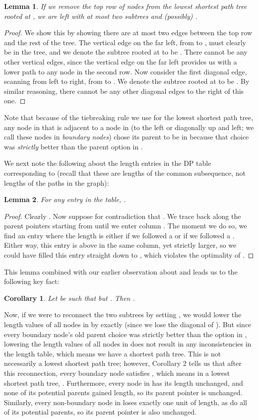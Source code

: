 \documentclass{article}
\newtheorem{lemma}{Lemma}
\newtheorem{corollary}{Corollary}
\begin{document}
\begin{lemma}
If we remove the top row of nodes from the lowest shortest path tree rooted at , we are left with at most two subtrees  and (possibly) .
\end{lemma}
\begin{proof}
We show this by showing there are at most two edges between the top row and the rest of the tree.  The vertical edge on the far left, from  to , must clearly be in the tree, and we denote the subtree rooted at  to be .  There cannot be any other vertical edges, since the vertical edge on the far left provides us with a lower path to any node in the second row.  Now consider the first diagonal edge, scanning from left to right, from  to .  We denote the subtree rooted at  to be .  By similar reasoning, there cannot be any other diagonal edges to the right of this one.
\end{proof}

Note that because of the tiebreaking rule we use for the lowest shortest path tree, any node in  that is adjacent to a node in  (to the left or diagonally up and left; we call these nodes in  \emph{boundary nodes}) chose its parent to be in  because that choice was \emph{strictly} better than the parent option in .

We next note the following about the length entries in the DP table corresponding to  (recall that these are lengths of the common subsequence, not lengths of the paths in the graph):
\begin{lemma}
For any entry  in the table, .
\end{lemma}
\begin{proof}
Clearly .  Now suppose for contradiction that .  We trace back along the parent pointers starting from  until we enter column .  The moment we do so, we find an entry where the length is either  if we followed a  or  if we followed a .  Either way, this entry is above  in the same column, yet strictly larger, so we could have filled this entry straight down to , which violates the optimality of .
\end{proof}

This lemma combined with our earlier observation about  and  leads us to the following key fact:
\begin{corollary}
Let  be such that  but .  Then .
\end{corollary}

Now, if we were to reconnect the two subtrees by setting , we would lower the length values of all nodes in  by exactly  (since we lose the diagonal of ).  But since every boundary node's old parent choice was strictly better than the option in , lowering the length values of all nodes in  does not result in any inconsistencies in the length table, which means we have a shortest path tree.  This is not necessarily a lowest shortest path tree; however, Corollary 2 tells us that after this reconnection, every boundary node  satisfies , which means in a lowest shortest path tree, .  Furthermore, every node in  has its length unchanged, and none of its potential parents gained length, so its parent pointer is unchanged.  Similarly, every non-boundary node in  loses exactly one unit of length, as do all of its potential parents, so its parent pointer is also unchanged.
\end{document}
